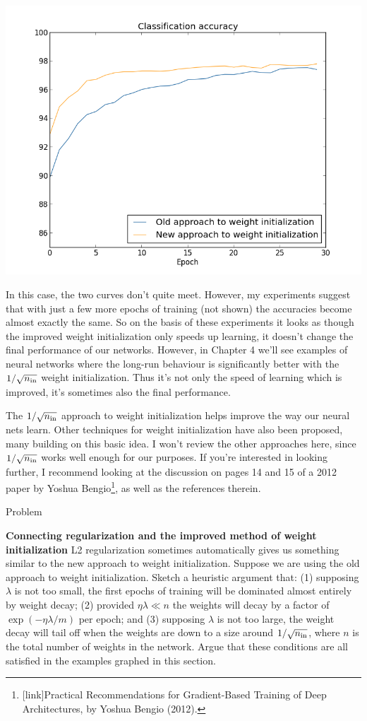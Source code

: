\documentclass[a4paper,twoside,10pt]{book}
\begin{document}
\begin{center}
	\includegraphics[width=0.7\linewidth]{figures/ch3/weight_initialization_100}
\end{center}
In this case, the two curves don't quite meet. However, my experiments suggest that with just a few more epochs of training (not shown) the accuracies become almost exactly the same. So on the basis of these experiments it looks as though the improved weight initialization only speeds up learning, it doesn't change the final performance of our networks. However, in Chapter 4 we'll see examples of neural networks where the long-run behaviour is significantly better with the $1/\sqrt{n_{\rm in}}$ weight initialization. Thus it's not only the speed of learning which is improved, it's sometimes also the final performance.

The $1/\sqrt{n_{\rm in}}$ approach to weight initialization helps improve the way our neural nets learn. Other techniques for weight initialization have also been proposed, many building on this basic idea. I won't review the other approaches here, since $1/\sqrt{n_{\rm in}}$ works well enough for our purposes. If you're interested in looking further, I recommend looking at the discussion on pages 14 and 15 of a 2012 paper by Yoshua Bengio\footnote{[link]Practical Recommendations for Gradient-Based Training of Deep Architectures, by Yoshua Bengio (2012).}, as well as the references therein.

\begin{exercize}{Problem}
	\item \textbf{Connecting regularization and the improved method of weight initialization} L2 regularization sometimes automatically gives us something similar to the new approach to weight initialization. Suppose we are using the old approach to weight initialization. Sketch a heuristic argument that: (1) supposing $\lambda$ is not too small, the first epochs of training will be dominated almost entirely by weight decay; (2) provided $\eta\lambda\ll n$ the weights will decay by a factor of $\exp(-\eta\lambda/m)$ per epoch; and (3) supposing $\lambda$ is not too large, the weight decay will tail off when the weights are down to a size around $1/\sqrt{n_{\rm in}}$, where $n$ is the total number of weights in the network. Argue that these conditions are all satisfied in the examples graphed in this section.
	\end{exercize}
\end{document}
